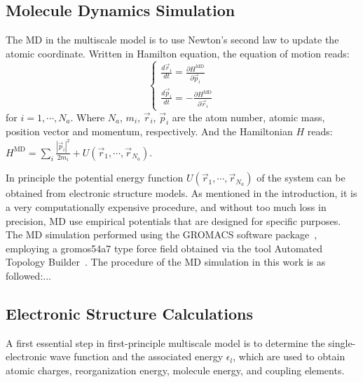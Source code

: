 \documentclass[letterpaper,12pt]{article}
\begin{document}
\subsection{Molecule Dynamics Simulation}
The MD in the multiscale model is to use Newton's second law to update the atomic coordinate. Written in Hamilton equation, the equation of motion reads:
\begin{equation}
    \begin{cases}
        \frac{d \vec{r}_i}{dt} = \frac{\partial H^\text{MD} }{\partial \vec{p}_i} \\
        \frac{d \vec{p}_i}{dt} = -\frac{\partial H^\text{MD} }{\partial \vec{r}_i}
    \end{cases}
    \label{eq:Hamilton}
\end{equation}
for $i=1,\cdots,N_a$. Where $N_a$, $m_i$, $\vec{r}_i$, $\vec{p}_i$ are the atom number, atomic mass,  position vector and momentum, respectively. 
And the Hamiltonian $H$ reads:
$H^\text{MD}=\sum\limits_{i} \frac{|\vec{p}_i|^2}{2 m_i} + U(\vec{r}_1,\cdots,\vec{r}_{N_a})$.

In principle the potential energy function $U(\vec{r}_1,\cdots,\vec{r}_{N_a})$ of the system can be obtained from electronic structure models. As mentioned in the introduction, it is a very computationally expensive procedure, and without too much loss in precision, MD use empirical potentials that are designed for specific purposes.
The MD simulation performed using the GROMACS software package~\cite{berendsen_gromacs_1995}, employing a gromos54a7 type force field obtained via the tool Automated Topology Builder~\cite{stroet_automated_2018}. 
The procedure of the MD simulation in this work is as followed:...

\subsection{Electronic Structure Calculations} 
A first essential step in first-principle multiscale model is to determine the single-electronic wave function and the associated energy $\epsilon_l$, which are used to obtain atomic charges, reorganization energy, molecule energy, and coupling elements.
\end{document}
